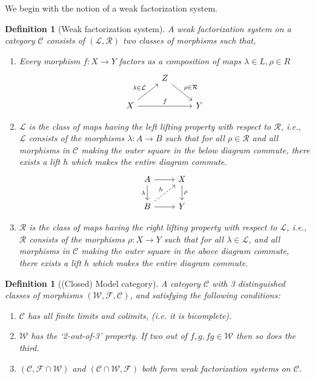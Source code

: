 \documentclass[12pt]{report}
\numberwithin{equation}{section}
\newtheorem{definition}[dummy]{Definition}
\begin{document}
	We begin with the notion of a weak factorization system.
	\begin{definition}[Weak factorization system]
		A weak factorization system on a category $\mathcal{C}$ consists of $(\mathcal{L,R})$ two classes of morphisms such that,
		\begin{enumerate}
			\item Every morphism $f:X \to Y$ factors as a composition of maps $\lambda \in L, \rho \in R $
			\[\begin{tikzcd}
				& Z \\
				X && Y
				\arrow["{\rho \in \mathcal{R}}", from=1-2, to=2-3]
				\arrow["{\lambda \in \mathcal{L}}", from=2-1, to=1-2]
				\arrow["f", from=2-1, to=2-3]
			\end{tikzcd}\]
			\item $\mathcal{L}$ is the class of maps having the left lifting property with respect to $\mathcal{R}$, i.e., $\mathcal{L}$ consists of the morphisms $\lambda :A \to B$ such that for all $\rho \in \mathcal{R}$ and all morphisms in $\mathcal{C}$ making the outer square in the below diagram commute, there exists a lift $h$ which makes the entire diagram commute.
			\[\begin{tikzcd}
				A & X \\
				B & Y
				\arrow[from=1-1, to=1-2]
				\arrow["\lambda"', from=1-1, to=2-1]
				\arrow["\rho", from=1-2, to=2-2]
				\arrow["h", dashed, from=2-1, to=1-2]
				\arrow[from=2-1, to=2-2]
			\end{tikzcd}\]
			
			
			
			\item $\mathcal{R}$ is the class of maps having the right lifting property with respect to $\mathcal{L}$, i.e., $\mathcal{R}$ consists of the morphisms $\rho :X \to Y$ such that for all $\lambda \in \mathcal{L}$, and all morphisms in $\mathcal{C}$ making the outer square in the above diagram commute, there exists a lift $h$ which makes the entire diagram commute.
		\end{enumerate}
	\end{definition}
	
	
	\begin{definition}[(Closed) Model category]
		A category $\mathcal{C}$ with 3 distinguished classes of morphisms $(\mathcal{W, F ,C})$, and satisfying the following conditions:
		\begin{enumerate}
			\item $\mathcal{C}$ has all finite limits and colimits, (i.e. it is bicomplete).
			\item $\mathcal{W}$ has the `2-out-of-3' property. If two out of $f, g, fg \in \mathcal{W}$ then so does the third.
			\item $(\mathcal{C},\mathcal{F}\cap \mathcal{W})$ and $(\mathcal{C}\cap \mathcal{W},\mathcal{F})$ both form weak factorization systems on $\mathcal{C}$.
		\end{enumerate}
	\end{definition}	
		
\end{document}
